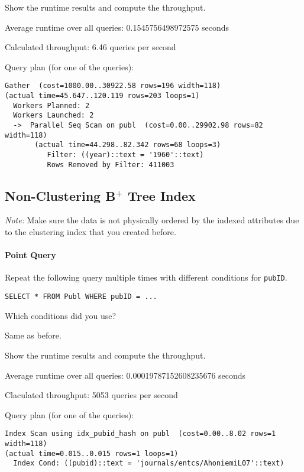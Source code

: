 \documentclass[11pt]{scrartcl}
\begin{document}
Show the runtime results and compute the throughput.

Average runtime over all queries: 0.1545756498972575 seconds

Calculated throughput: 6.46 queries per second

Query plan (for one of the queries):

{\small
\parskip0pt\begin{verbatim}
Gather  (cost=1000.00..30922.58 rows=196 width=118) 
(actual time=45.647..120.119 rows=203 loops=1)
  Workers Planned: 2
  Workers Launched: 2
  ->  Parallel Seq Scan on publ  (cost=0.00..29902.98 rows=82 width=118) 
       (actual time=44.298..82.342 rows=68 loops=3)
          Filter: ((year)::text = '1960'::text)
          Rows Removed by Filter: 411003
\end{verbatim}}

\subsection*{Non-Clustering B$^+$ Tree Index}

\emph{Note:} Make sure the data is not physically ordered by the indexed attributes due to the clustering index that you created before.

\paragraph{Point Query}

Repeat the following query multiple times with different conditions for \texttt{pubID}.

\begin{lstlisting}[style=dbtsql]
SELECT * FROM Publ WHERE pubID = ...
\end{lstlisting}

Which conditions did you use?

Same as before.

Show the runtime results and compute the throughput.

Average runtime over all queries: 0.00019787152608235676 seconds

Claculated throughput: 5053 queries per second

Query plan (for one of the queries):

{\small
\parskip0pt\begin{verbatim}
Index Scan using idx_pubid_hash on publ  (cost=0.00..8.02 rows=1 width=118) 
(actual time=0.015..0.015 rows=1 loops=1)
  Index Cond: ((pubid)::text = 'journals/entcs/AhoniemiL07'::text)
\end{verbatim}}
\end{document}
